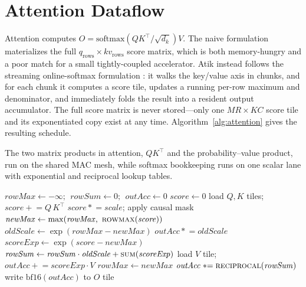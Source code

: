 \documentclass[sigconf,nonacm]{acmart}
\begin{document}
\section{Attention Dataflow}
\label{sec:attention}

Attention computes $O = \mathrm{softmax}\!\left(QK^\top\!/\sqrt{d_k}\right)V$.
The naive formulation materializes the full $q_{\text{rows}}\times
kv_{\text{rows}}$ score matrix, which is both memory-hungry and a poor match for
a small tightly-coupled accelerator. Atik instead follows the streaming
online-softmax formulation \cite{onlinesoftmax}: it walks the key/value axis in
chunks, and for each chunk it computes a score tile, updates a running per-row
maximum and denominator, and immediately folds the result into a resident output
accumulator. The full score matrix is never stored---only one
$\mathit{MR}\times\mathit{KC}$ score tile and its exponentiated copy exist at any
time. Algorithm~\ref{alg:attention} gives the resulting schedule.

The two matrix products in attention, $QK^\top$ and the probability--value
product, run on the shared MAC mesh, while softmax bookkeeping runs on one
scalar lane with exponential and reciprocal lookup tables.

\begin{algorithm}[t]
\caption{Atik tiled online-softmax attention. $MR$/$NC$ are the mesh row/column
  tile sizes, $KC$ the key/value chunk, and $KT$ the internal reduction depth.
  The score matrix is never fully materialized; $QK^\top$ and the
  probability--value product run on the shared mesh, and the softmax update runs
  on the scalar lane.}
\label{alg:attention}
\begin{algorithmic}[1]
    \State $\mathit{rowMax}\gets-\infty;\ \ \mathit{rowSum}\gets0;\ \ \mathit{outAcc}\gets0$
      \State $\mathit{score}\gets0$ 
        \State load $Q,K$ tiles;\ \ $\mathit{score}\mathrel{+}=Q\,K^\top$
      \EndFor
      \State $\mathit{score}\mathrel{*}=\mathit{scale}$; apply causal mask 
      \State $\mathit{newMax}\gets\max(\mathit{rowMax},\ \textsc{rowmax}(\mathit{score}))$
      \State $\mathit{oldScale}\gets\exp(\mathit{rowMax}-\mathit{newMax})$
      \State $\mathit{outAcc}\mathrel{*}=\mathit{oldScale}$
      \State $\mathit{scoreExp}\gets\exp(\mathit{score}-\mathit{newMax})$
      \State $\mathit{rowSum}\gets\mathit{rowSum}\cdot\mathit{oldScale}+\textsc{sum}(\mathit{scoreExp})$
      \State load $V$ tile;\ \ $\mathit{outAcc}\mathrel{+}=\mathit{scoreExp}\cdot V$ 
      \State $\mathit{rowMax}\gets\mathit{newMax}$
    \EndFor
    \State $\mathit{outAcc}\mathrel{*}=\textsc{reciprocal}(\mathit{rowSum})$ 
    \State write $\mathrm{bf16}(\mathit{outAcc})$ to $O$ tile
  \EndFor
\EndFor
\end{algorithmic}
\end{algorithm}
\end{document}
